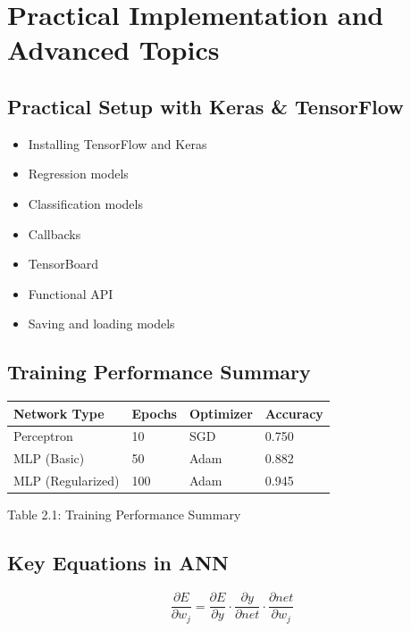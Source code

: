 \documentclass[12pt,openany]{book}
\begin{document}

\chapter{Practical Implementation and Advanced Topics}

\section{Practical Setup with Keras \& TensorFlow}

\begin{itemize}
    \item Installing TensorFlow and Keras
    \item Regression models
    \item Classification models
    \item Callbacks
    \item TensorBoard
    \item Functional API
    \item Saving and loading models
\end{itemize}

\section{Training Performance Summary}

\begin{center}
\begin{tabular}{|l|l|l|l|}
\hline
Network Type & Epochs & Optimizer & Accuracy\\
\hline
Perceptron & 10 & SGD & 0.750\\
MLP (Basic) & 50 & Adam & 0.882\\
MLP (Regularized) & 100 & Adam & 0.945\\
\hline
\end{tabular}

\vspace{0.3cm}
Table 2.1: Training Performance Summary
\end{center}

\section{Key Equations in ANN}

\[
\frac{\partial E}{\partial w_j}
=
\frac{\partial E}{\partial y}
\cdot
\frac{\partial y}{\partial net}
\cdot
\frac{\partial net}{\partial w_j}
\]
\end{document}
